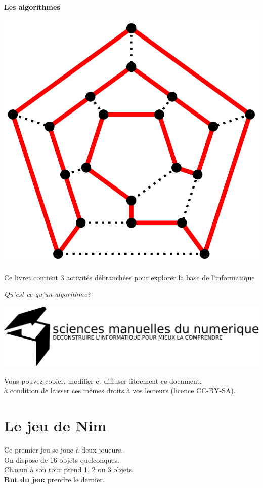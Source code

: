 \documentclass[a7paper,pagesize,DIV=14,10pt]{scrbook}
\begin{document}
\begin{center}
  \textbf{\huge Les algorithmes}
  
  \includegraphics[width=.5\linewidth]{img/Hamiltonian_path.pdf}
\end{center}

\vspace{-.5\baselineskip} %
Ce livret contient 3 activités débranchées pour explorer la base de
l'informatique

\medskip
\centerline{\large\textit{Qu'est ce qu'un algorithme?}}

\bigskip
\centerline{  \includegraphics[width=.9\linewidth]{img/logo_SMN.pdf}}

\begin{spacing}{.5}
{\tiny Vous pouvez copier, modifier et diffuser librement ce document,\\
  à condition de laisser ces mêmes droits à vos lecteurs (licence CC-BY-SA).}
\end{spacing}
\section*{Le jeu de Nim}

\vspace{-.5\baselineskip}
Ce premier jeu se joue à deux joueurs.\\
On dispose de 16 objets quelconques.\\
Chacun à son tour prend 1, 2 ou 3 objets.\\
\textbf{But du jeu:} prendre le dernier.
\end{document}
